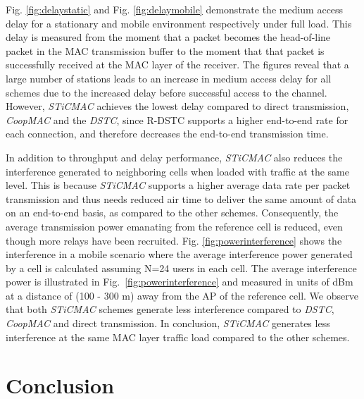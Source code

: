\documentclass[peerreview,draftcls,onecolumn,12pt,a4paper]{IEEEtran}
\begin{document}
Fig. \ref{fig:delaystatic} and Fig. \ref{fig:delaymobile}
demonstrate the medium access delay  for a stationary and mobile
environment respectively under full load. This delay is measured
from the moment that a packet becomes the {head-of-line} packet in
the MAC transmission buffer to the moment that that packet is
successfully received at the MAC layer of the receiver. The
figures reveal that a large number of stations leads to an
increase in medium access delay for all schemes due to the
increased delay before successful access to the channel. However,
\emph{STiCMAC} achieves the lowest delay compared to direct
transmission, \emph{CoopMAC}  and the \emph{DSTC}, since R-DSTC
supports a higher end-to-end rate for each connection, and
therefore decreases the end-to-end transmission time.

In addition to throughput and delay performance, \emph{STiCMAC}
also reduces the interference generated to neighboring cells when
loaded with traffic at the same level. This is because \emph{STiCMAC} supports a
higher average data rate per packet transmission and thus needs
reduced air time to deliver the same amount of data on an
end-to-end basis, as compared to the other schemes. Consequently,
the average transmission power emanating from the reference cell
is reduced, even though more relays have been recruited. Fig.
\ref{fig:powerinterference} shows the interference in a mobile
scenario where the average interference power generated by a cell
is calculated assuming N=24 users in each cell. The average
interference power is illustrated in
Fig.~\ref{fig:powerinterference} and measured in units of dBm at a
distance of (100 - 300 m) away from the AP of the reference cell.
We observe that both \emph{STiCMAC} schemes generate less
interference compared to {\em DSTC}, \emph{CoopMAC} and direct
transmission. In conclusion, \emph{STiCMAC} generates less
interference at the same MAC layer traffic load compared to the
other schemes.


\vspace{-0.2in}
\section{Conclusion}
\label{Conclusion}
\end{document}
